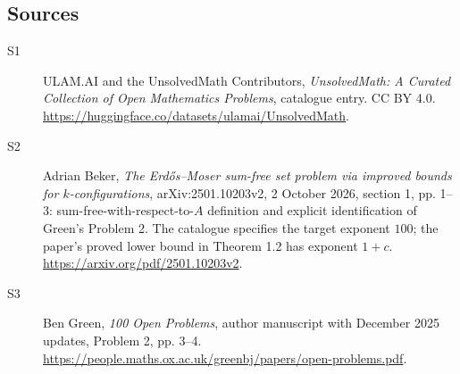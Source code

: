 \documentclass[11pt]{article}
\begin{document}
\subsection{Sources}
\begin{description}
\item[\hypertarget{source:statement:1}{S1}] ULAM.AI and the UnsolvedMath Contributors, \emph{UnsolvedMath: A Curated Collection of Open Mathematics Problems}, catalogue entry. CC BY 4.0. \url{https://huggingface.co/datasets/ulamai/UnsolvedMath}.
\item[\hypertarget{source:statement:2}{S2}] Adrian Beker, \emph{The Erdős--Moser sum-free set problem via improved bounds for $k$-configurations}, arXiv:2501.10203v2, 2 October 2026, section 1, pp. 1--3: sum-free-with-respect-to-$A$ definition and explicit identification of Green's Problem 2. The catalogue specifies the target exponent $100$; the paper's proved lower bound in Theorem 1.2 has exponent $1+c$. \url{https://arxiv.org/pdf/2501.10203v2}.
\item[\hypertarget{source:statement:3}{S3}] Ben Green, \emph{100 Open Problems}, author manuscript with December 2025 updates, Problem 2, pp. 3--4. \url{https://people.maths.ox.ac.uk/greenbj/papers/open-problems.pdf}.
\end{description}
\label{end:statement}
\end{document}
